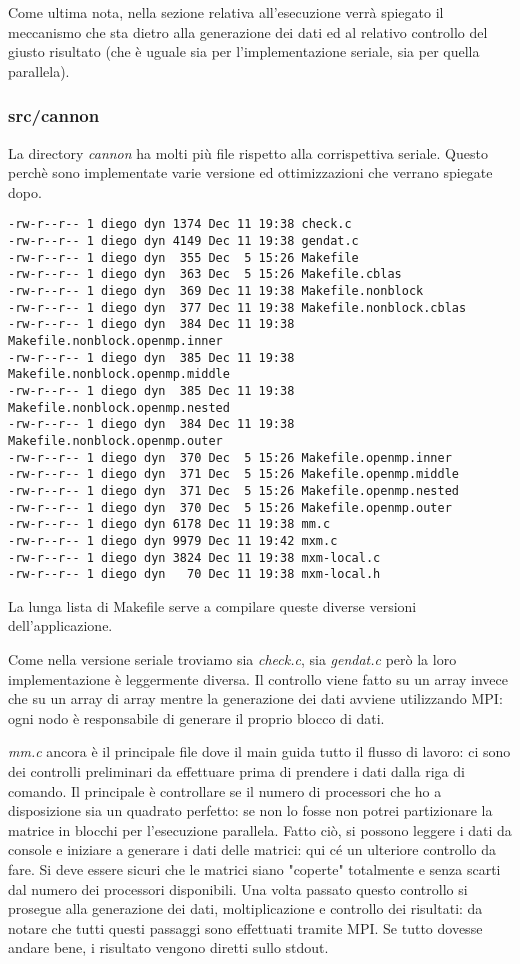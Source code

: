 Come ultima nota, nella sezione relativa all'esecuzione verr\`{a} spiegato il meccanismo che sta dietro alla generazione dei dati ed al relativo controllo del giusto risultato (che \`{e} uguale sia per l'implementazione seriale, sia per quella parallela).

\subsubsection{src/cannon}
La directory \textit{cannon} ha molti pi\`{u} file rispetto alla corrispettiva seriale. Questo perch\`{e} sono implementate varie versione ed ottimizzazioni che verrano spiegate dopo.

\begin{lstlisting}
-rw-r--r-- 1 diego dyn 1374 Dec 11 19:38 check.c
-rw-r--r-- 1 diego dyn 4149 Dec 11 19:38 gendat.c
-rw-r--r-- 1 diego dyn  355 Dec  5 15:26 Makefile
-rw-r--r-- 1 diego dyn  363 Dec  5 15:26 Makefile.cblas
-rw-r--r-- 1 diego dyn  369 Dec 11 19:38 Makefile.nonblock
-rw-r--r-- 1 diego dyn  377 Dec 11 19:38 Makefile.nonblock.cblas
-rw-r--r-- 1 diego dyn  384 Dec 11 19:38 Makefile.nonblock.openmp.inner
-rw-r--r-- 1 diego dyn  385 Dec 11 19:38 Makefile.nonblock.openmp.middle
-rw-r--r-- 1 diego dyn  385 Dec 11 19:38 Makefile.nonblock.openmp.nested
-rw-r--r-- 1 diego dyn  384 Dec 11 19:38 Makefile.nonblock.openmp.outer
-rw-r--r-- 1 diego dyn  370 Dec  5 15:26 Makefile.openmp.inner
-rw-r--r-- 1 diego dyn  371 Dec  5 15:26 Makefile.openmp.middle
-rw-r--r-- 1 diego dyn  371 Dec  5 15:26 Makefile.openmp.nested
-rw-r--r-- 1 diego dyn  370 Dec  5 15:26 Makefile.openmp.outer
-rw-r--r-- 1 diego dyn 6178 Dec 11 19:38 mm.c
-rw-r--r-- 1 diego dyn 9979 Dec 11 19:42 mxm.c
-rw-r--r-- 1 diego dyn 3824 Dec 11 19:38 mxm-local.c
-rw-r--r-- 1 diego dyn   70 Dec 11 19:38 mxm-local.h
\end{lstlisting}

La lunga lista di Makefile serve a compilare queste diverse versioni dell'applicazione.

Come nella versione seriale troviamo sia \textit{check.c}, sia \textit{gendat.c} per\`{o} la loro implementazione \`{e} leggermente diversa. Il controllo viene fatto su un array invece che su un array di array mentre la generazione dei dati avviene utilizzando MPI: ogni nodo \`{e} responsabile di generare il proprio blocco di dati.

\textit{mm.c} ancora \`{e} il principale file dove il main guida tutto il flusso di lavoro: ci sono dei controlli preliminari da effettuare prima di prendere i dati dalla riga di comando. Il principale \`{e} controllare se il numero di processori che ho a disposizione sia un quadrato perfetto: se non lo fosse non potrei partizionare la matrice in blocchi per l'esecuzione parallela. Fatto ci\`{o}, si possono leggere i dati da console e iniziare a generare i dati delle matrici: qui c\'{e} un ulteriore controllo da fare. Si deve essere sicuri che le matrici siano "coperte" totalmente e senza scarti dal numero dei processori disponibili. Una volta passato questo controllo si prosegue alla generazione dei dati, moltiplicazione e controllo dei risultati: da notare che tutti questi passaggi sono effettuati tramite MPI. Se tutto dovesse andare bene, i risultato vengono diretti sullo stdout.


